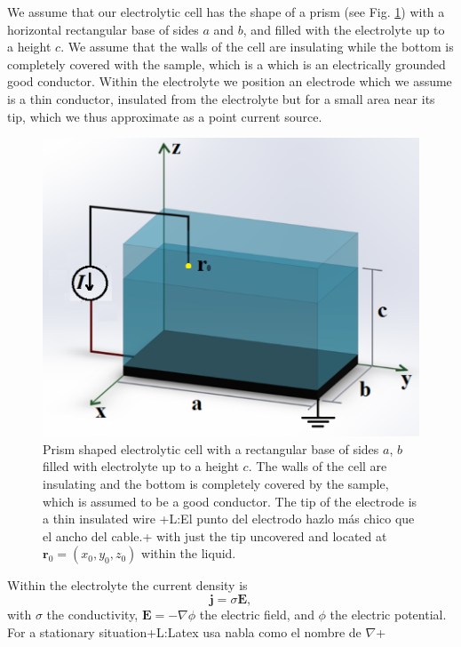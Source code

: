 \documentclass{article}
\newcommand{\notaL}[1]{{\color{blue}+L:#1+}}
\begin{document}
We assume that our electrolytic cell has the shape of a
prism (see Fig. \ref{f:celda}) with a horizontal rectangular base of sides $a$ and $b$, and
filled with the electrolyte up to a height $c$. We assume that the
walls of the cell are insulating while the bottom is completely
covered with the sample, which is a which is an
electrically grounded good conductor. Within the electrolyte we position an electrode
which we assume is a thin conductor, insulated from the electrolyte
but for a small area near its tip, which we thus approximate as a
point current source.
\begin{figure}
  \centering
  \includegraphics[width=\textwidth]{Images/celdan1}
  \caption{Prism shaped electrolytic cell with a rectangular base of
    sides $a$, $b$ filled with electrolyte up to a height $c$. The
    walls of the cell are insulating and the bottom is completely
    covered by the sample, which is assumed to be a good
    conductor. The tip of the electrode is a thin insulated wire
    \notaL{El punto del electrodo hazlo más chico que el ancho
      del cable.} with just the tip uncovered and located at $\bm r_0=(x_0,y_0,z_0)$ within the
    liquid.}
  \label{f:celda}
\end{figure}
Within the electrolyte the current density is
\begin{equation}
  \label{eq:j}
  \bm j=\sigma\bm E,
\end{equation}
with
$\sigma$ the conductivity, $\bm E=-\nabla\phi$ the electric field,
and $\phi$ the electric potential. For a
stationary situation\notaL{Latex usa nabla como el nombre de
  $\nabla$}
\end{document}
